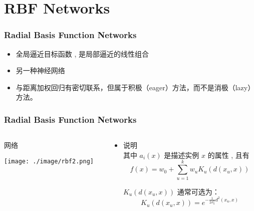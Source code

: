 \documentclass{beamer}
\begin{document}
\section{RBF Networks}
\label{sec-4}
\begin{frame}
\frametitle{Radial Basis Function Networks}
\label{sec-4-1}

\begin{itemize}
\item 全局逼近目标函数 , 是局部逼近的线性组合
\item 另一种神经网络
\item 与距离加权回归有密切联系，但属于积极（eager）方法，而不是消极（lazy）方法。
\end{itemize}
\end{frame}
\begin{frame}
\frametitle{Radial Basis Function Networks}
\label{sec-4-2}
\begin{columns}
\begin{column}{0.5\textwidth}
\begin{block}{网络}
\label{sec-4-2-1}

\texttt{[image: ./image/rbf2.png]}
\end{block}
\end{column}
\begin{column}{0.5\textwidth}
\begin{itemize}

\item 说明\\
\label{sec-4-2-2}%
其中 $a_i(x)$ 是描述实例 $x$ 的属性 , 且有
$$f(x) =  w_0 + \sum_{u=1}^{k} w_u K_u(d(x_u,x))$$

 $K_u(d(x_u,x))$ 通常可选为：
$$K_u(d(x_u,x)) = e^{- \frac{1}{2 \sigma_u^2}d^2(x_u,x)}$$

\end{itemize} %
\end{column}
\end{columns}
\end{frame}
\end{document}
